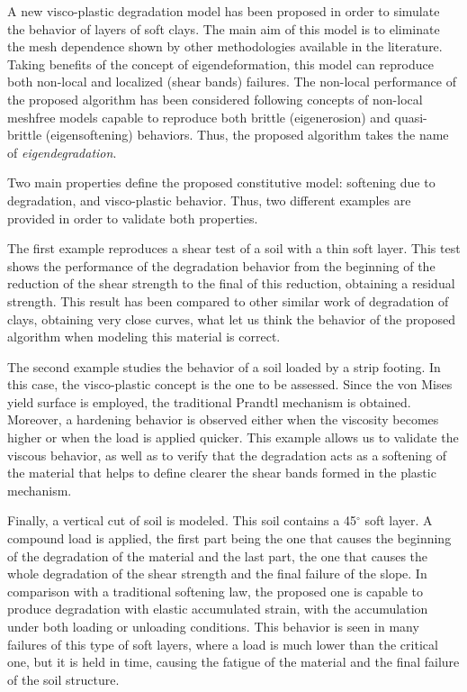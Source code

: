 \documentclass[applsci,journal,article,submit,moreauthors,pdftex]{Definitions/mdpi}
\begin{document}
A new visco-plastic degradation model has been proposed in order to simulate the behavior of layers of soft clays. The main aim of this model is to eliminate the mesh dependence shown by other methodologies available in the literature. Taking benefits of the concept of eigendeformation, this model can reproduce both non-local and localized (shear bands) failures. The non-local performance of the proposed algorithm has been considered following concepts of non-local meshfree models capable to reproduce both brittle (eigenerosion) and quasi-brittle (eigensoftening) behaviors. Thus, the proposed algorithm takes the name of \textit{eigendegradation}.

Two main properties define the proposed constitutive model: softening due to degradation, and visco-plastic behavior. Thus, two different examples are provided in order to validate both properties.

The first example reproduces a shear test of a soil with a thin soft layer. This test shows the performance of the degradation behavior from the beginning of the reduction of the shear strength to the final of this reduction, obtaining a residual strength. This result has been compared to other similar work of degradation of clays, obtaining very close curves,  what let us think the behavior of the proposed algorithm when modeling this material is correct.

The second example studies the behavior of a soil loaded by a strip footing. In this case, the visco-plastic concept is the one to be assessed. Since the von Mises yield surface is employed, the traditional Prandtl mechanism is obtained. Moreover, a hardening behavior is observed either when the viscosity becomes higher or when the load is applied quicker. This example allows us to validate the viscous behavior, as well as to verify that the degradation acts as a softening of the material that helps to define clearer the shear bands formed in the plastic mechanism.

Finally, a vertical cut of soil is modeled. This soil contains a 45$^\circ$ soft layer. A compound load is applied, the first part being the one that causes the beginning of the degradation of the material and the last part, the one that causes the whole degradation of the shear strength and the final failure of the slope. In comparison with a traditional softening law, the proposed one is capable to produce degradation with elastic accumulated strain, with the accumulation under both loading or unloading conditions. This behavior is seen in many failures of this type of soft layers, where a load is much lower than the critical one, but it is held in time, causing the fatigue of the material and the final failure of the soil structure. 
\end{document}
